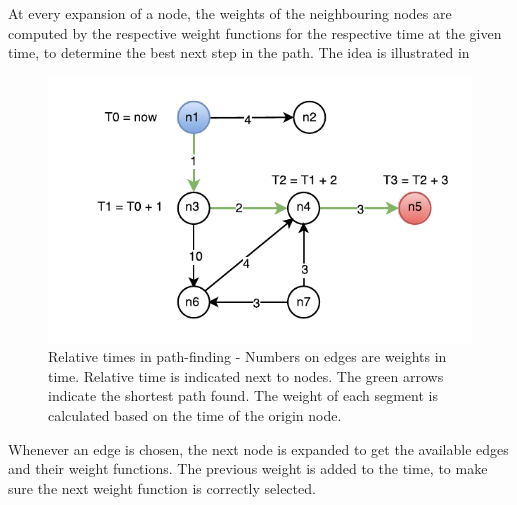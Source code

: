 At every expansion of a node, the weights of the neighbouring nodes are computed by the respective weight functions for the respective time at the given time, to determine the best next step in the path. The idea is illustrated in  
\begin{figure}[h]
\centering
\includegraphics[width=\linewidth]{figures/timed-graph}
\caption{Relative times in path-finding - Numbers on edges are weights in time. Relative time is indicated next to nodes. The green arrows indicate the shortest path found. The weight of each segment is calculated based on the time of the origin node.}
\label{fig:timed-graph}
\end{figure}

Whenever an edge is chosen, the next node is expanded to get the available edges and their weight functions. The previous weight is added to the time, to make sure the next weight function is correctly selected. 




